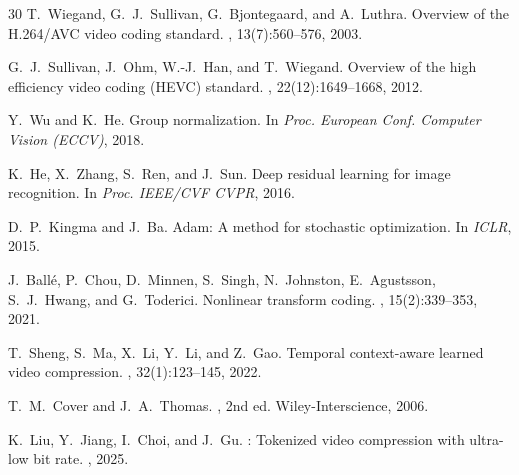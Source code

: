 \documentclass[sigconf, screen, review, anonymous]{acmart}
\begin{document}
\begin{thebibliography}{30}
T.~Wiegand, G.~J.~Sullivan, G.~Bjontegaard, and A.~Luthra.
\newblock Overview of the {H.264/AVC} video coding standard.
, 13(7):560--576,
  2003.

G.~J.~Sullivan, J.~Ohm, W.-J.~Han, and T.~Wiegand.
\newblock Overview of the high efficiency video coding ({HEVC}) standard.
, 22(12):1649--1668,
  2012.

Y.~Wu and K.~He.
\newblock Group normalization.
\newblock In {\em Proc. European Conf. Computer Vision (ECCV)}, 2018.

K.~He, X.~Zhang, S.~Ren, and J.~Sun.
\newblock Deep residual learning for image recognition.
\newblock In {\em Proc. IEEE/CVF CVPR}, 2016.

D.~P.~Kingma and J.~Ba.
\newblock Adam: A method for stochastic optimization.
\newblock In {\em ICLR}, 2015.

J.~Ball\'{e}, P.~Chou, D.~Minnen, S.~Singh, N.~Johnston, E.~Agustsson,
  S.~J.~Hwang, and G.~Toderici.
\newblock Nonlinear transform coding.
, 15(2):339--353, 2021.

T.~Sheng, S.~Ma, X.~Li, Y.~Li, and Z.~Gao.
\newblock Temporal context-aware learned video compression.
, 32(1):123--145,
  2022.

T.~M.~Cover and J.~A.~Thomas.
, 2nd ed.
\newblock Wiley-Interscience, 2006.

K.~Liu, Y.~Jiang, I.~Choi, and J.~Gu.
: Tokenized video compression with ultra-low bit rate.
, 2025.

\end{thebibliography}
\end{document}
